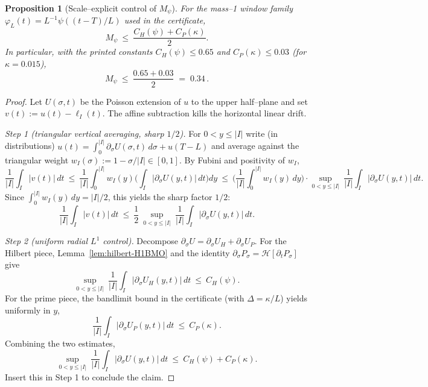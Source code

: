 \documentclass[11pt]{article}
\newtheorem{proposition}[theorem]{Proposition}
\theoremstyle{definition}
\theoremstyle{remark}
\begin{document}
\begin{proposition}[Scale–explicit control of $M_\psi$]\label{prop:Mpsi-closed}
For the mass–1 window family $\varphi_L(t)=L^{-1}\psi((t-T)/L)$ used in the certificate,
\[
  M_\psi\ \le\ \frac{C_H(\psi)+C_P(\kappa)}{2}.
\]
In particular, with the printed constants $C_H(\psi)\le 0.65$ and $C_P(\kappa)\le 0.03$ (for $\kappa=0.015$),
\[
  M_\psi\ \le\ \frac{0.65+0.03}{2}\;=\;0.34\,.
\]
\end{proposition}
\begin{proof}
Let $U(\sigma,t)$ be the Poisson extension of $u$ to the upper half–plane and set $v(t):=u(t)-\ell_I(t)$. The affine subtraction kills the horizontal linear drift.

\emph{Step 1 (triangular vertical averaging, sharp $1/2$).} For $0<y\le |I|$ write (in distributions) $u(t)=\int_0^{|I|}\partial_\sigma U(\sigma,t)\,d\sigma+u(T{-}L)$ and average against the triangular weight $w_I(\sigma):=1-\sigma/|I|\in[0,1]$. By Fubini and positivity of $w_I$,
\[
  \frac{1}{|I|}\int_I |v(t)|\,dt
  \ \le\ \frac{1}{|I|}\int_0^{|I|}w_I(y)\Big(\int_I |\partial_\sigma U(y,t)|\,dt\Big)dy
  \ \le\ \Big(\frac{1}{|I|}\int_0^{|I|} w_I(y)\,dy\Big)\cdot\sup_{0<y\le |I|}\ \frac{1}{|I|}\int_I |\partial_\sigma U(y,t)|\,dt.
\]
Since $\int_0^{|I|} w_I(y)\,dy=|I|/2$, this yields the sharp factor $1/2$:
\[
  \frac{1}{|I|}\int_I |v(t)|\,dt\ \le\ \frac{1}{2}\ \sup_{0<y\le |I|}\ \frac{1}{|I|}\int_I |\partial_\sigma U(y,t)|\,dt.
\]

\emph{Step 2 (uniform radial $L^1$ control).} Decompose $\partial_\sigma U=\partial_\sigma U_H+\partial_\sigma U_P$. For the Hilbert piece, Lemma~\ref{lem:hilbert-H1BMO} and the identity $\partial_\sigma P_\sigma=\mathcal H[\partial_t P_\sigma]$ give
\[
  \sup_{0<y\le |I|}\ \frac{1}{|I|}\int_I |\partial_\sigma U_H(y,t)|\,dt\ \le\ C_H(\psi).
\]
For the prime piece, the bandlimit bound in the certificate (with $\Delta=\kappa/L$) yields uniformly in $y$,
\[
  \frac{1}{|I|}\int_I |\partial_\sigma U_P(y,t)|\,dt\ \le\ C_P(\kappa).
\]
Combining the two estimates,
\[
  \sup_{0<y\le |I|}\ \frac{1}{|I|}\int_I |\partial_\sigma U(y,t)|\,dt\ \le\ C_H(\psi)+C_P(\kappa).
\]
Insert this in Step 1 to conclude the claim.
\end{proof}


\end{document}
